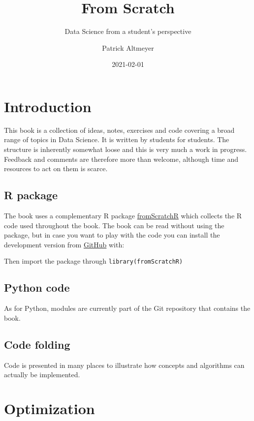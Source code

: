 \documentclass[
]{book}
\title{From Scratch}
\subtitle{Data Science from a student's perspective}
\author{Patrick Altmeyer}
\date{2021-02-01}
\begin{document}
\maketitle

{
\setcounter{tocdepth}{1}
\tableofcontents
}
\hypertarget{intro}{%
\chapter{Introduction}\label{intro}}

This book is a collection of ideas, notes, exercises and code covering a broad range of topics in Data Science. It is written by students for students. The structure is inherently somewhat loose and this is very much a work in progress. Feedback and comments are therefore more than welcome, although time and resources to act on them is scarce.

\hypertarget{r-package}{%
\section{R package}\label{r-package}}

The book uses a complementary R package \href{https://github.com/pat-alt/fromScratchR}{fromScratchR} which collects the R code used throughout the book. The book can be read without using the package, but in case you want to play with the code you can install the development version from \href{https://github.com/}{GitHub} with:

Then import the package through \texttt{library(fromScratchR)}

\hypertarget{python-code}{%
\section{Python code}\label{python-code}}

As for Python, modules are currently part of the Git repository that contains the book.

\hypertarget{code-folding}{%
\section{Code folding}\label{code-folding}}

Code is presented in many places to illustrate how concepts and algorithms can actually be implemented.

\hypertarget{det-opt}{%
\chapter{Optimization}\label{det-opt}}
\end{document}
